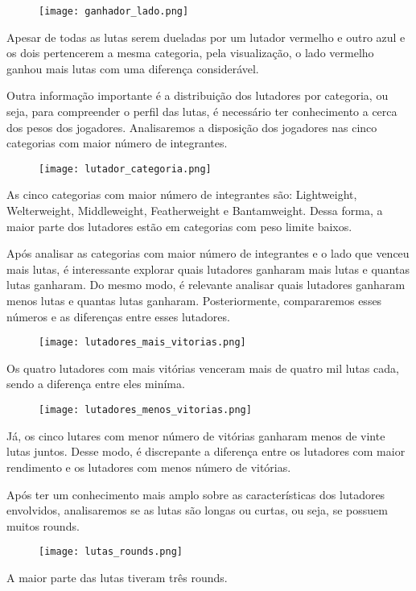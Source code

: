 \documentclass{article}
\begin{document}
\begin{figure}[H] 
    \centering 
    \texttt{[image: ganhador\_lado.png]} 
\end{figure}

\par Apesar de todas as lutas serem dueladas por um lutador vermelho e outro azul e os dois pertencerem a mesma categoria, pela visualização, o lado vermelho ganhou mais lutas com uma diferença considerável.
\par Outra informação importante é a distribuição dos lutadores por categoria, ou seja, para compreender o perfil das lutas, é necessário  ter conhecimento a cerca dos pesos dos jogadores. Analisaremos a disposição dos jogadores nas cinco categorias com maior número de integrantes.
    
\begin{figure}[H] 
    \centering 
    \texttt{[image: lutador\_categoria.png]} 
\end{figure}

\par As cinco categorias com maior número de integrantes são: Lightweight, Welterweight, Middleweight, Featherweight e Bantamweight. Dessa forma, a maior parte dos lutadores estão em categorias com peso limite baixos.
\par Após analisar as categorias com maior número de integrantes e o lado que venceu mais lutas, é interessante explorar quais lutadores ganharam mais lutas e quantas lutas ganharam. Do mesmo modo, é relevante analisar quais lutadores ganharam menos lutas e quantas lutas ganharam. Posteriormente, compararemos esses números e as diferenças entre esses lutadores.
    
\begin{figure}[H] 
    \centering 
    \texttt{[image: lutadores\_mais\_vitorias.png]} 
\end{figure}
  
\par Os quatro lutadores com mais vitórias venceram mais de quatro mil lutas cada, sendo a diferença entre eles miníma. 

\begin{figure}[H] 
    \centering 
    \texttt{[image: lutadores\_menos\_vitorias.png]} 
\end{figure}

\par Já, os cinco lutares com menor número de vitórias ganharam menos de vinte lutas juntos. Desse modo, é discrepante a diferença entre os lutadores com maior rendimento e os lutadores com menos número de vitórias.
\par Após ter um conhecimento mais amplo sobre as características dos lutadores envolvidos, analisaremos se as lutas são longas ou curtas, ou seja, se possuem muitos rounds.

\begin{figure}[H] 
    \centering 
    \texttt{[image: lutas\_rounds.png]} 
\end{figure}

\par A maior parte das lutas tiveram três rounds. 
\end{document}
